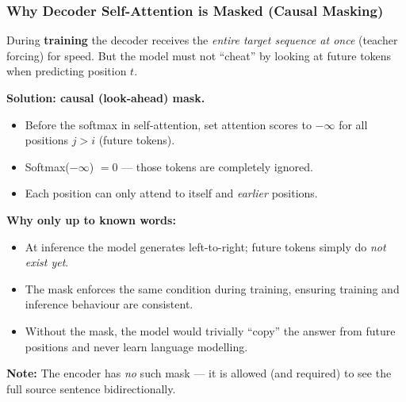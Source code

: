 \begin{frame}[fragile]\frametitle{Why Decoder Self-Attention is Masked (Causal Masking)}

During \textbf{training} the decoder receives the \emph{entire target sequence at once} (teacher forcing) for speed. But the model must not ``cheat'' by looking at future tokens when predicting position $t$.

\textbf{Solution: causal (look-ahead) mask.}

\begin{itemize}
\item Before the softmax in self-attention, set attention scores to $-\infty$ for all positions $j > i$ (future tokens).
\item Softmax($-\infty$) $= 0$ --- those tokens are completely ignored.
\item Each position can only attend to itself and \emph{earlier} positions.
\end{itemize}

\textbf{Why only up to known words:}
\begin{itemize}
\item At inference the model generates left-to-right; future tokens simply do \emph{not exist yet}.
\item The mask enforces the same condition during training, ensuring training and inference behaviour are consistent.
\item Without the mask, the model would trivially ``copy'' the answer from future positions and never learn language modelling.
\end{itemize}

\textbf{Note:} The encoder has \emph{no} such mask --- it is allowed (and required) to see the full source sentence bidirectionally.

\end{frame}

